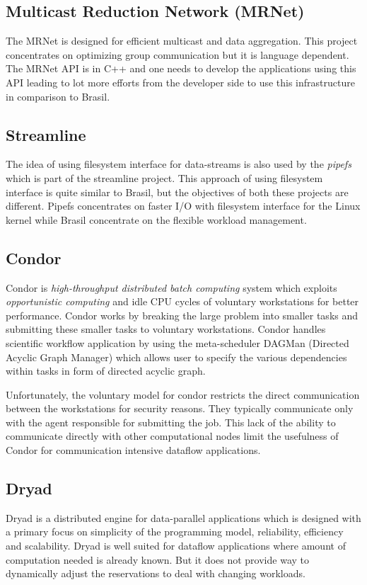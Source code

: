 \documentclass[conference]{sig-alternate}
\begin{document}
\subsection{Multicast Reduction Network (MRNet)}
The MRNet\cite{MRNet} is designed for efficient multicast and data aggregation.
This project concentrates on optimizing group communication but it is language
dependent.  The MRNet API is in C++ and one needs to develop the applications
using this API leading to lot more efforts from the developer side to use this
infrastructure in comparison to Brasil.

\subsection{Streamline}
The idea of using filesystem interface for data-streams is also used by the
\textit{pipefs}\cite{1400104} which is part of the streamline\cite{streamline}
project.  This approach of using filesystem interface is quite similar to
Brasil, but the objectives of both these projects are different. Pipefs
concentrates on faster I/O with filesystem interface for the Linux kernel
while Brasil concentrate on the flexible workload management.

\subsection{Condor}
Condor\cite{condor-practice} is \textit{high-throughput distributed batch
computing} system which exploits \textit{opportunistic computing} and idle CPU
cycles of voluntary workstations for better performance.  Condor works by
breaking the large problem into smaller tasks and submitting these smaller
tasks to voluntary workstations. Condor handles scientific workflow
application by using the meta-scheduler DAGMan (Directed Acyclic Graph Manager)
which allows user to specify the various dependencies within tasks in form of
directed acyclic graph. 

Unfortunately, the voluntary model for condor restricts the direct communication
between the workstations for security reasons.  They typically communicate
only with the agent responsible for submitting the job.  This lack of the
ability to communicate directly with other computational nodes limit the
usefulness of Condor for communication intensive dataflow applications.


\subsection{Dryad}
Dryad\cite{yu2008dsg} is a distributed engine for data-parallel applications
which is designed with a primary focus on simplicity of the programming model,
reliability, efficiency and scalability.  Dryad is well suited for dataflow
applications where amount of computation needed is already known.  But it does
not provide way to dynamically adjust the reservations to deal with changing
workloads.    
\end{document}
